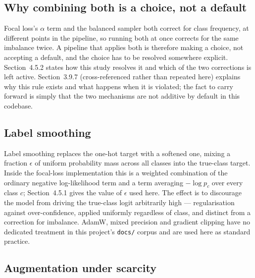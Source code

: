 \subsection{Why combining both is a choice, not a default}
\label{sec:combining-both}

Focal loss's $\alpha$ term and the balanced sampler both correct for class frequency, at different points in the pipeline, so running both at once corrects for the same imbalance twice. A pipeline that applies both is therefore making a choice, not accepting a default, and the choice has to be resolved somewhere explicit. Section~4.5.2 states how this study resolves it and which of the two corrections is left active. Section~3.9.7 (cross-referenced rather than repeated here) explains why this rule exists and what happens when it is violated; the fact to carry forward is simply that the two mechanisms are not additive by default in this codebase.

\subsection{Label smoothing}
\label{sec:label-smoothing}

Label smoothing replaces the one-hot target with a softened one, mixing a fraction $\epsilon$ of uniform probability mass across all classes into the true-class target. Inside the focal-loss implementation this is a weighted combination of the ordinary negative log-likelihood term and a term averaging $-\log p_c$ over every class $c$; Section~4.5.1 gives the value of $\epsilon$ used here. The effect is to discourage the model from driving the true-class logit arbitrarily high --- regularisation against over-confidence, applied uniformly regardless of class, and distinct from a correction for imbalance. AdamW, mixed precision and gradient clipping have no dedicated treatment in this project's \texttt{docs/} corpus and are used here as standard practice.

\subsection{Augmentation under scarcity}
\label{sec:augmentation}

